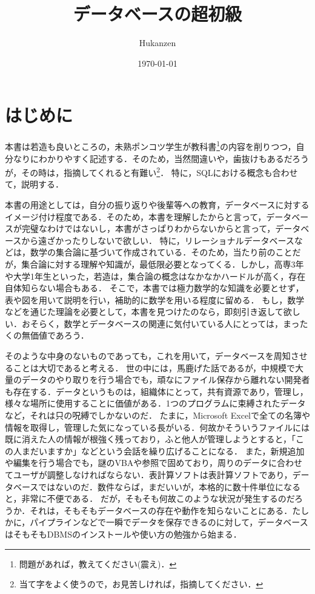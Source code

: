 \documentclass[a4paper,10pt]{jreport}
\title{データベースの超初級}
\author{Hukanzen}
\date{\today}
\begin{document}
\maketitle

\tableofcontents %

\chapter{はじめに}
本書は若造も良いところの，未熟ポンコツ学生が教科書\footnote{問題があれば，教えてください(震え)．}の内容を削りつつ，自分なりにわかりやすく記述する．そのため，当然間違いや，歯抜けもあるだろうが，その時は，指摘してくれると有難い\footnote{当て字をよく使うので，お見苦しければ，指摘してください．}．
特に，SQLにおける概念も合わせて，説明する．
\par 本書の用途としては，自分の振り返りや後輩等への教育，データベースに対するイメージ付け程度である．そのため，本書を理解したからと言って，データベースが完璧なわけではないし，本書がさっぱりわからないからと言って，データベースから遠ざかったりしないで欲しい．
特に，リレーショナルデータベースなどは，数学の集合論に基づいて作成されている．そのため，当たり前のことだが，集合論に対する理解や知識が，最低限必要となってくる．しかし，高専3年や大学1年生といった，若造は，集合論の概念はなかなかハードルが高く，存在自体知らない場合もある．
そこで，本書では極力数学的な知識を必要とせず，表や図を用いて説明を行い，補助的に数学を用いる程度に留める．
もし，数学などを通じた理論を必要として，本書を見つけたのなら，即刻引き返して欲しい．おそらく，数学とデータベースの関連に気付いている人にとっては，まったくの無価値であろう．
\par そのような中身のないものであっても，これを用いて，データベースを周知させることは大切であると考える．
世の中には，馬鹿げた話であるが，中規模で大量のデータのやり取りを行う場合でも，頑なにファイル保存から離れない開発者も存在する．データというものは，組織体にとって，共有資源であり，管理し，様々な場所に使用することに価値がある．1つのプログラムに束縛されたデータなど，それは只の呪縛でしかないのだ．
たまに，Microsoft Excelで全ての名簿や情報を取得し，管理した気になっている長がいる．何故かそういうファイルには既に消えた人の情報が根強く残っており，ふと他人が管理しようとすると，「この人まだいますか」などという会話を繰り広げることになる．
また，新規追加や編集を行う場合でも，謎のVBAや参照で固めており，周りのデータに合わせてユーザが調整しなければならない．表計算ソフトは表計算ソフトであり，データベースではないのだ．数件ならば，まだいいが，本格的に数十件単位になると，非常に不便である．
だが，そもそも何故このような状況が発生するのだろうか．それは，そもそもデータベースの存在や動作を知らないことにある．たしかに，パイプラインなどで一瞬でデータを保存できるのに対して，データベースはそもそもDBMSのインストールや使い方の勉強から始まる．
\end{document}
